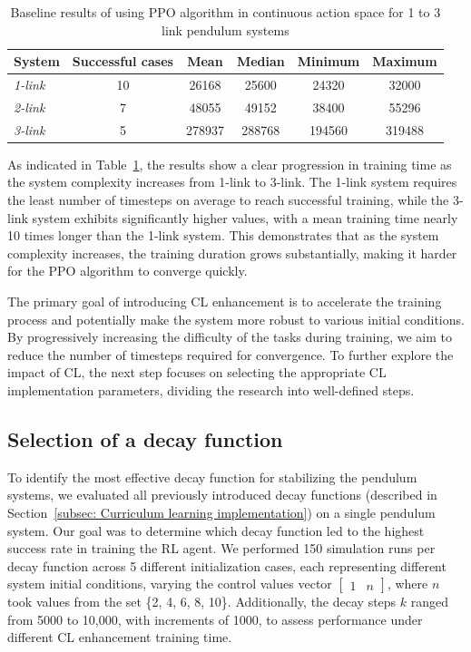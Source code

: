 \begin{table}[ht]
	\centering
	\caption{Baseline results of using PPO algorithm in continuous action space for 1 to 3 link pendulum systems}
	\begin{tabular}{@{}lccccc@{}}
		\toprule
		\textbf{System} & \textbf{Successful cases} & \textbf{Mean} & \textbf{Median} & \textbf{Minimum} & \textbf{Maximum} \\ \midrule
		\textit{1-link} & 10 & 26168 & 25600 & 24320 & 32000 \\
		\textit{2-link} & 7 & 48055 & 49152 & 38400 & 55296 \\
		\textit{3-link} & 5 & 278937 & 288768 & 194560 & 319488 \\ \bottomrule
	\end{tabular}
	\label{tab: baseline statistics for PPO in continuous action space}
\end{table}

As indicated in Table~\ref{tab: baseline statistics for PPO in continuous action space}, the results show a clear progression in training time as the system complexity increases from 1-link to 3-link. The 1-link system requires the least number of timesteps on average to reach successful training, while the 3-link system exhibits significantly higher values, with a mean training time nearly 10 times longer than the 1-link system. This demonstrates that as the system complexity increases, the training duration grows substantially, making it harder for the PPO algorithm to converge quickly.

The primary goal of introducing CL enhancement is to accelerate the training process and potentially make the system more robust to various initial conditions. By progressively increasing the difficulty of the tasks during training, we aim to reduce the number of timesteps required for convergence. To further explore the impact of CL, the next step focuses on selecting the appropriate CL implementation parameters, dividing the research into well-defined steps. 

\subsection{Selection of a decay function}

To identify the most effective decay function for stabilizing the pendulum systems, we evaluated all previously introduced decay functions (described in Section~\ref{subsec: Curriculum learning implementation}) on a single pendulum system. Our goal was to determine which decay function led to the highest success rate in training the RL agent. We performed 150 simulation runs per decay function across 5 different initialization cases, each representing different system initial conditions, varying the control values vector \(\begin{bmatrix} 1 & n \end{bmatrix}\), where $n$ took values from the set \{2, 4, 6, 8, 10\}. Additionally, the decay steps $k$ ranged from 5000 to 10,000, with increments of 1000, to assess performance under different CL enhancement training time.

